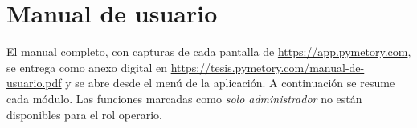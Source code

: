 \section*{Manual de usuario} \label{sec:ManualesdeUsuario}

El manual completo, con capturas de cada pantalla de \url{https://app.pymetory.com}, se entrega como anexo digital en \url{https://tesis.pymetory.com/manual-de-usuario.pdf} y se abre desde el menú de la aplicación. A continuación se resume cada módulo. Las funciones marcadas como \textit{solo administrador} no están disponibles para el rol operario.

